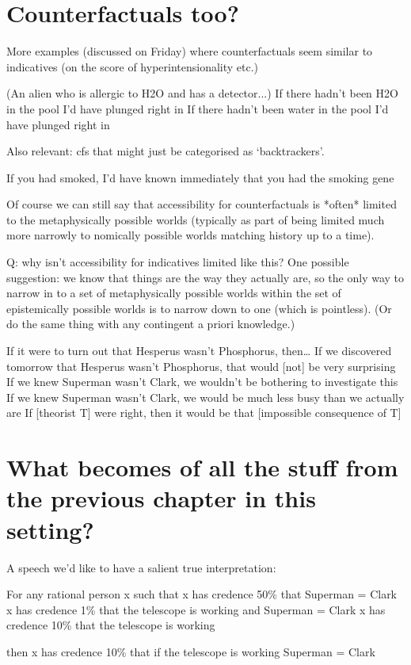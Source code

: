 \documentclass[If.tex]{subfiles}
\begin{document}
\section{Counterfactuals too?}
More examples (discussed on Friday) where counterfactuals seem similar to indicatives (on the score of hyperintensionality etc.)

(An alien who is allergic to H2O and has a detector...)
If there hadn't been H2O in the pool I'd have plunged right in
If there hadn't been water in the pool I'd have plunged right in

Also relevant: cfs that might just be categorised as ‘backtrackers’.  

If you had smoked, I'd have known immediately that you had the smoking gene

Of course we can still say that accessibility for counterfactuals is *often* limited to the metaphysically possible worlds (typically as part of being limited much more narrowly to nomically possible worlds matching history up to a time).  

Q: why isn't accessibility for indicatives limited like this?  One possible suggestion: we know that things are the way they actually are, so the only way to narrow in to a set of metaphysically possible worlds within the set of epistemically possible worlds is to narrow down to one (which is pointless).  (Or do the same thing with any contingent a priori knowledge.)

	
			If it were to turn out that Hesperus wasn't Phosphorus, then…
			If we discovered tomorrow that Hesperus wasn't Phosphorus, that would [not] be very surprising
			If we knew Superman wasn't Clark, we wouldn't be bothering to investigate this
			If we knew Superman wasn't Clark, we would be much less busy than we actually are
			If [theorist T] were right, then it would be that [impossible consequence of T]
			



\section{What becomes of all the stuff from the previous chapter in this setting?}

A speech we'd like to have a salient true interpretation:

For any rational person x such that
	x has credence 50\% that Superman = Clark
	x has credence 1\% that the telescope is working and Superman = Clark
	x has credence 10\% that the telescope is working

then x has credence 10\% that if the telescope is working Superman = Clark
\end{document}

